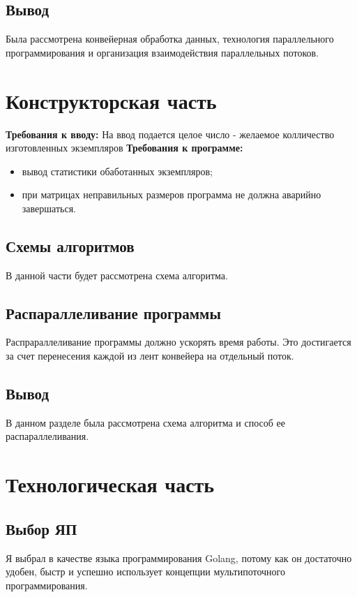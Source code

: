 \documentclass[12pt]{report}
\begin{document}
\section{Вывод}
Была рассмотрена конвейерная обработка данных, технология параллельного программирования и
организация взаимодействия параллельных потоков.

\chapter{Конструкторская часть}
\textbf{Требования к вводу:}
На ввод подается целое число - желаемое колличество изготовленных экземпляров
\newline
\textbf{Требования к программе:}
\begin{itemize}
	\item вывод статистики обаботанных экземпляров;
	\item при матрицах неправильных размеров программа не должна аварийно завершаться.
\end{itemize}

\section{Схемы алгоритмов}
В данной части будет рассмотрена схема алгоритма.

\section{Распараллеливание программы}
Распрараллеливание программы должно ускорять время работы. Это достигается за счет перенесения каждой из лент конвейера на отдельный поток.

\section{Вывод}
В данном разделе была рассмотрена схема алгоритма и способ ее распараллеливания.

\chapter{Технологическая часть}
\section{Выбор ЯП}
Я выбрал в качестве языка программирования Golang, потому как он достаточно удобен, быстр и успешно использует концепции мультипоточного программирования.
\end{document}
